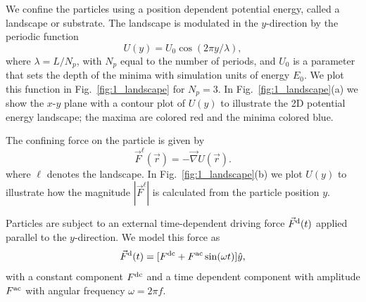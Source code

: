 \documentclass[preprint,showpacs,preprintnumbers,amsmath,amssymb,aps,prb]{revtex4-1}
\theoremstyle{remark}
\begin{document}
We confine the particles using a position dependent 
potential energy, called a landscape or substrate.
The landscape is modulated in the $y$-direction
by the periodic function 
 \begin{equation}
   U(y) = U_0 \cos{(2 \pi y / \lambda)},
     \label{eq:ysubstrate}
\end{equation}
where $\lambda=L/N_p$, with $N_p$ equal to the number of periods,
and $U_0$ is a parameter
 that sets the depth of the minima
 with simulation units of energy $E_0$. 
 We plot this function in 
 Fig.~\ref{fig:1_landscape}
 for $N_p = 3$.  In Fig.~\ref{fig:1_landscape}(a) we show 
 the $x$-$y$ plane with a contour plot of $U(y)$ 
 to illustrate
 the 2D potential energy landscape;
 the maxima are colored red and the minima colored blue.

The confining force on the particle %
 is given by
 \begin{equation}
 \vec{F}^{\ell}(\vec{r}) = - \vec \nabla U(\vec{r}). %
 \label{eq:dudr}
 \end{equation}
 where $\ell$ denotes the landscape.
 In Fig.~\ref{fig:1_landscape}(b) we plot  
 $U(y)$ to illustrate how the magnitude
 $|\vec{F}^{\ell}|$ is calculated from the particle position $y$.
 
Particles are subject to an external time-dependent driving force
$\vec{F}^{\rm d}(t)$
applied parallel to the $y$-direction.
We model this force as
\begin{equation}
  \vec{F}^{\rm d}(t) = [F^{\rm dc} + F^{\rm ac} \sin(\omega t)] \hat{y},
    \label{eq:drive}
\end{equation}
with 
a constant component $F^{\rm dc}$
and a time dependent component with amplitude $F^{\rm ac}$
with angular frequency $\omega = 2 \pi f$.
\end{document}
